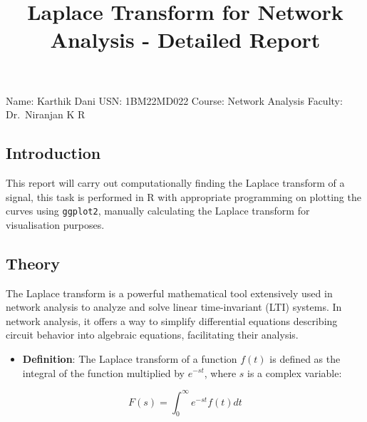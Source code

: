 \documentclass[
]{article}
\title{Laplace Transform for Network Analysis - Detailed Report}
\author{}
\date{\vspace{-2.5em}}
\providecommand{\tightlist}{%
  \setlength{\itemsep}{0pt}\setlength{\parskip}{0pt}}
\begin{document}
\maketitle

\hypertarget{section}{%
\section{}\label{section}}

Name: Karthik Dani \textbar{} USN: 1BM22MD022 \textbar{} Course: Network
Analysis \textbar{} Faculty: Dr.~Niranjan K R

\hypertarget{introduction}{%
\subsection{Introduction}\label{introduction}}

This report will carry out computationally finding the Laplace transform
of a signal, this task is performed in R with appropriate programming on
plotting the curves using \texttt{ggplot2}, manually calculating the
Laplace transform for visualisation purposes.

\hypertarget{theory}{%
\subsection{Theory}\label{theory}}

The Laplace transform is a powerful mathematical tool extensively used
in network analysis to analyze and solve linear time-invariant (LTI)
systems. In network analysis, it offers a way to simplify differential
equations describing circuit behavior into algebraic equations,
facilitating their analysis.

\begin{itemize}
\tightlist
\item
  \textbf{Definition}: The Laplace transform of a function \(f(t)\) is
  defined as the integral of the function multiplied by \(e^{-st}\),
  where \(s\) is a complex variable:
\end{itemize}

\[
F(s) = \int_0^{\infty} e^{-st} f(t) dt
\]
\end{document}
